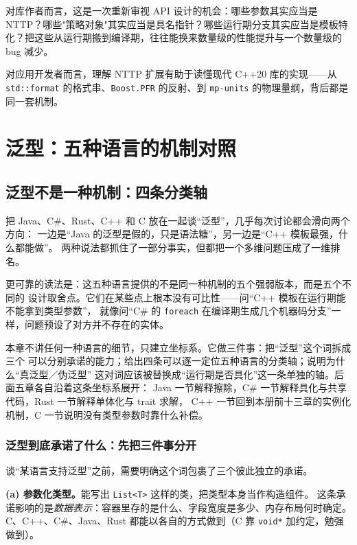\documentclass[12pt,a4paper,fontset=fandol]{ctexbook}
\newcommand{\cpp}[1]{C++#1}
\newcommand{\kw}[1]{\texttt{#1}}
\begin{document}
对库作者而言，这是一次重新审视 API 设计的机会：哪些参数其实应当是 NTTP？哪些"策略对象"其实应当是具名指针？哪些运行期分支其实应当是模板特化？把这些从运行期搬到编译期，往往能换来数量级的性能提升与一个数量级的 bug 减少。

对应用开发者而言，理解 NTTP 扩展有助于读懂现代 \cpp{20} 库的实现——从 \kw{std::format} 的格式串、\kw{Boost.PFR} 的反射、到 \kw{mp-units} 的物理量纲，背后都是同一套机制。


\part{泛型：五种语言的机制对照}

\chapter{泛型不是一种机制：四条分类轴}

把 Java、C\#、Rust、\cpp{} 和 C 放在一起谈“泛型”，几乎每次讨论都会滑向两个方向：
一边是“Java 的泛型是假的，只是语法糖”，另一边是“\cpp{} 模板最强，什么都能做”。
两种说法都抓住了一部分事实，但都把一个多维问题压成了一维排名。

更可靠的读法是：这五种语言提供的不是同一种机制的五个强弱版本，而是五个不同的
设计取舍点。它们在某些点上根本没有可比性——问“\cpp{} 模板在运行期能不能拿到类型参数”，
就像问“C\# 的 \kw{foreach} 在编译期生成几个机器码分支”一样，问题预设了对方并不存在的实体。

本章不讲任何一种语言的细节，只建立坐标系。它做三件事：把“泛型”这个词拆成三个
可以分别承诺的能力；给出四条可以逐一定位五种语言的分类轴；说明为什么“真泛型／伪泛型”
这对词应该被替换成“运行期是否具化”这一条单独的轴。后面五章各自沿着这条坐标系展开：
Java 一节解释擦除，C\# 一节解释具化与共享代码，Rust 一节解释单体化与 trait 求解，
\cpp{} 一节回到本册前十三章的实例化机制，C 一节说明没有类型参数时靠什么补偿。

\section{泛型到底承诺了什么：先把三件事分开}

谈“某语言支持泛型”之前，需要明确这个词包裹了三个彼此独立的承诺。

\textbf{(a) 参数化类型。}能写出 \kw{List<T>} 这样的类，把类型本身当作构造组件。
这条承诺影响的是\emph{数据表示}：容器里存的是什么、字段宽度是多少、内存布局何时确定。
C、\cpp{}、C\#、Java、Rust 都能以各自的方式做到（C 靠 \kw{void*} 加约定，勉强做到）。
\end{document}
